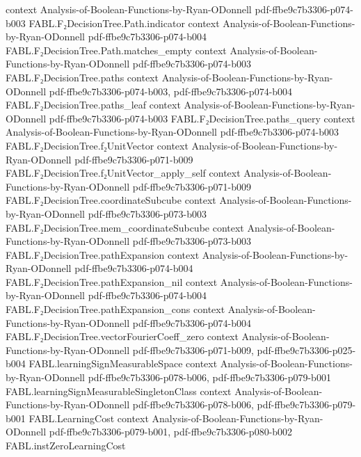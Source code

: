 \begin{theorem}
  {context}
  {Analysis-of-Boolean-Functions-by-Ryan-ODonnell}
  {pdf-ffbe9c7b3306-p074-b003}
\proofstep
  {FABL.F₂DecisionTree.Path.indicator}
  {context}
  {Analysis-of-Boolean-Functions-by-Ryan-ODonnell}
  {pdf-ffbe9c7b3306-p074-b004}
\proofstep
  {FABL.F₂DecisionTree.Path.matches_empty}
  {context}
  {Analysis-of-Boolean-Functions-by-Ryan-ODonnell}
  {pdf-ffbe9c7b3306-p074-b003}
\proofstep
  {FABL.F₂DecisionTree.paths}
  {context}
  {Analysis-of-Boolean-Functions-by-Ryan-ODonnell}
  {pdf-ffbe9c7b3306-p074-b003,
    pdf-ffbe9c7b3306-p074-b004}
\proofstep
  {FABL.F₂DecisionTree.paths_leaf}
  {context}
  {Analysis-of-Boolean-Functions-by-Ryan-ODonnell}
  {pdf-ffbe9c7b3306-p074-b003}
\proofstep
  {FABL.F₂DecisionTree.paths_query}
  {context}
  {Analysis-of-Boolean-Functions-by-Ryan-ODonnell}
  {pdf-ffbe9c7b3306-p074-b003}
\proofstep
  {FABL.F₂DecisionTree.f₂UnitVector}
  {context}
  {Analysis-of-Boolean-Functions-by-Ryan-ODonnell}
  {pdf-ffbe9c7b3306-p071-b009}
\proofstep
  {FABL.F₂DecisionTree.f₂UnitVector_apply_self}
  {context}
  {Analysis-of-Boolean-Functions-by-Ryan-ODonnell}
  {pdf-ffbe9c7b3306-p071-b009}
\proofstep
  {FABL.F₂DecisionTree.coordinateSubcube}
  {context}
  {Analysis-of-Boolean-Functions-by-Ryan-ODonnell}
  {pdf-ffbe9c7b3306-p073-b003}
\proofstep
  {FABL.F₂DecisionTree.mem_coordinateSubcube}
  {context}
  {Analysis-of-Boolean-Functions-by-Ryan-ODonnell}
  {pdf-ffbe9c7b3306-p073-b003}
\proofstep
  {FABL.F₂DecisionTree.pathExpansion}
  {context}
  {Analysis-of-Boolean-Functions-by-Ryan-ODonnell}
  {pdf-ffbe9c7b3306-p074-b004}
\proofstep
  {FABL.F₂DecisionTree.pathExpansion_nil}
  {context}
  {Analysis-of-Boolean-Functions-by-Ryan-ODonnell}
  {pdf-ffbe9c7b3306-p074-b004}
\proofstep
  {FABL.F₂DecisionTree.pathExpansion_cons}
  {context}
  {Analysis-of-Boolean-Functions-by-Ryan-ODonnell}
  {pdf-ffbe9c7b3306-p074-b004}
\proofstep
  {FABL.F₂DecisionTree.vectorFourierCoeff_zero}
  {context}
  {Analysis-of-Boolean-Functions-by-Ryan-ODonnell}
  {pdf-ffbe9c7b3306-p071-b009,
    pdf-ffbe9c7b3306-p025-b004}
\proofstep
  {FABL.learningSignMeasurableSpace}
  {context}
  {Analysis-of-Boolean-Functions-by-Ryan-ODonnell}
  {pdf-ffbe9c7b3306-p078-b006,
    pdf-ffbe9c7b3306-p079-b001}
\proofstep
  {FABL.learningSignMeasurableSingletonClass}
  {context}
  {Analysis-of-Boolean-Functions-by-Ryan-ODonnell}
  {pdf-ffbe9c7b3306-p078-b006,
    pdf-ffbe9c7b3306-p079-b001}
\proofstep
  {FABL.LearningCost}
  {context}
  {Analysis-of-Boolean-Functions-by-Ryan-ODonnell}
  {pdf-ffbe9c7b3306-p079-b001,
    pdf-ffbe9c7b3306-p080-b002}
\proofstep
  {FABL.instZeroLearningCost}

\end{theorem}
